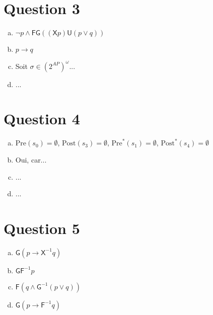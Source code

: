 \documentclass{article}
\newcommand{\Pre}{\mathrm{Pre}}                %
\newcommand{\Post}{\mathrm{Post}}              %
\newcommand{\X}{{\mathsf{X}}}
\newcommand{\F}{{\mathsf{F}}}
\newcommand{\G}{{\mathsf{G}}}
\newcommand{\U}{\mathrel{\mathsf{U}}}
\begin{document}
\section*{Question 3}

\begin{enumerate}[(a)]

\item $\neg p \land \F\G((\X p) \U (p \lor q))$

\item $p \rightarrow q$

\item Soit $\sigma \in (2^{AP})^\omega$...

\item ...

\end{enumerate}

\section*{Question 4}

\begin{enumerate}[(a)]

\item $\Pre(s_0) = \emptyset$, $\Post(s_3) = \emptyset$, $\Pre^*(s_1)
  = \emptyset$, $\Post^*(s_4) = \emptyset$

\item Oui, car...

\item ...

\item ...

\end{enumerate}

\section*{Question 5}

\begin{enumerate}[(a)]
  \item $\G(p \rightarrow \X^{-1} q)$

  \item $\G \F^{-1} p$
  
  \item $\F(q \land \G^{-1} (p \lor q))$

  \item $\G(p \rightarrow \F^{-1} q)$
\end{enumerate}
\end{document}
